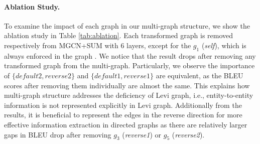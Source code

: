 \documentclass[11pt,a4paper]{article}
\begin{document}
\paragraph{Ablation Study.}
To examine the impact of each graph in our multi-graph structure, 
we show the ablation study in Table \ref{tab:ablation}.
Each transformed graph is removed respectively from MGCN+SUM with 6 layers, except for the $g_1$ (\textit{self}), which is always enforced in the graph \cite{kipf2016semi}.
We notice that the result drops after removing any transformed graph from the multi-graph.
Particularly, we observe the importance of $\{\textit{default2}, \textit{reverse2}\}$ and $\{\textit{default1}, \textit{reverse1}\}$ are equivalent, as the BLEU scores after removing them individually are almost the same.
This explains how multi-graph structure addresses the deficiency of Levi graph, i.e., entity-to-entity information 
is not represented explicitly in Levi graph. 
Additionally from the results, it is beneficial to represent the edges in the reverse direction for more effective information extraction in directed graphs as there are relatively larger gaps in BLEU drop after removing $g_3$ (\textit{reverse1}) or $g_5$ (\textit{reverse2}).


\begin{table}[t!]
	\centering
\caption{An example of generated sentences.}
	\label{tab:case}
\end{table}
\end{document}
